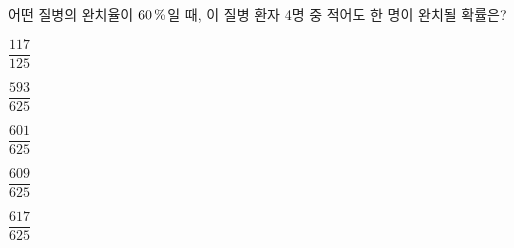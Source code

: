 어떤 질병의 완치율이 $60\mkern3mu \%$일 때, 이 질병 환자 4명 중 적어도 한 명이 완치될 확률은?
\begin{choicesii}{\rule[-3ex]{0pt}{8ex}$\dfrac{117}{125}$}{\rule[-3ex]{0pt}{8ex}$\dfrac{593}{625}$}{\rule[-3ex]{0pt}{8ex}$\dfrac{601}{625}$}{\rule[-3ex]{0pt}{8ex}$\dfrac{609}{625}$}{\rule[-3ex]{0pt}{8ex}$\dfrac{617}{625}$}\end{choicesii}
